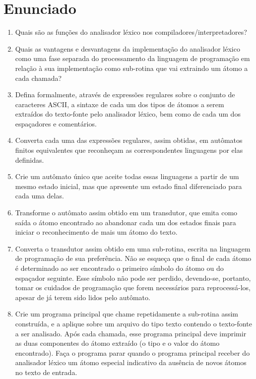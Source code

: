 \label{Cap:Léxico}

\section{Enunciado}
\begin{enumerate}

\item{Quais são as funções do analisador léxico nos compiladores/interpretadores?}

\item{Quais as vantagens e desvantagens da implementação do analisador léxico como uma fase separada do
processamento da linguagem de programação em relação à sua implementação como sub-rotina que vai
extraindo um átomo a cada chamada?}

\item{Defina formalmente, através de expressões regulares sobre o conjunto de caracteres ASCII, a sintaxe de cada um dos tipos de átomos a serem extraídos do texto-fonte pelo analisador léxico, bem como de cada um dos
espaçadores e comentários.}

\item{Converta cada uma das expressões regulares, assim obtidas, em autômatos finitos equivalentes que reconheçam as correspondentes linguagens por elas definidas.}

\item{Crie um autômato único que aceite todas essas linguagens a partir de um mesmo estado inicial, mas que apresente um estado final diferenciado para cada uma delas.}

\item{Transforme o autômato assim obtido em um transdutor, que emita como saída o átomo encontrado ao abandonar cada um dos estados finais para iniciar o reconhecimento de mais um átomo do texto.}

\item{Converta o transdutor assim obtido em uma sub-rotina, escrita na linguagem de programação de sua preferência. Não se esqueça que o final de cada átomo é determinado ao ser encontrado o primeiro símbolo do átomo ou do espaçador seguinte. Esse símbolo não pode ser perdido, devendo-se, portanto, tomar os cuidados de programação que forem necessários para reprocessá-los, apesar de já terem sido lidos pelo autômato.}

\item{Crie um programa principal que chame repetidamente a sub-rotina assim construída, e a aplique sobre um arquivo do tipo texto contendo o texto-fonte a ser analisado. Após cada chamada, esse programa principal deve imprimir as duas componentes do átomo extraído (o tipo e o valor do átomo encontrado). Faça o programa parar quando o programa principal receber do analisador léxico um átomo especial indicativo da ausência de novos átomos no texto de entrada.}


\end{enumerate}
